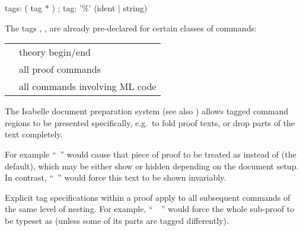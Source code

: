 \begin{isabellebody}
\begin{isamarkuptext}
  \begin{rail}
    tags: ( tag * )
    ;
    tag: '\%' (ident | string)
  \end{rail}

  The tags , ,  are already
  pre-declared for certain classes of commands:

 \medskip

  \begin{tabular}{ll}
    \isa{{\isachardoublequote}theory{\isachardoublequote}} & theory begin/end \\
    \isa{{\isachardoublequote}proof{\isachardoublequote}} & all proof commands \\
    \isa{{\isachardoublequote}ML{\isachardoublequote}} & all commands involving ML code \\
  \end{tabular}

  \medskip The Isabelle document preparation system (see also
  \cite{isabelle-sys}) allows tagged command regions to be presented
  specifically, e.g.\ to fold proof texts, or drop parts of the text
  completely.

  For example ``\hyperlink{command.by}{\mbox{}}~'' would
  cause that piece of proof to be treated as  instead
  of  (the default), which may be either show or hidden
  depending on the document setup.  In contrast, ``\hyperlink{command.by}{\mbox{}}~'' would force this text to be shown
  invariably.

  Explicit tag specifications within a proof apply to all subsequent
  commands of the same level of nesting.  For example, ``\hyperlink{command.proof}{\mbox{}}~~\hyperlink{command.qed}{\mbox{}}'' would force the
  whole sub-proof to be typeset as  (unless some of its
  parts are tagged differently).%
\end{isamarkuptext}%
\isamarkuptrue%
%
\isadelimtheory
%
\endisadelimtheory
%
\isatagtheory
{}\isamarkupfalse%
%
\endisatagtheory
{\isafoldtheory}%
%
\isadelimtheory
%
\endisadelimtheory
\isanewline
\end{isabellebody}%
